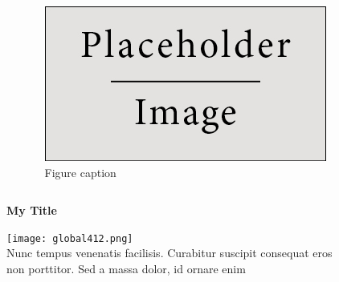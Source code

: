 \documentclass[final]{beamer}
\newlength{\onecolwid}
\newlength{\twocolwid}
\begin{document}
\begin{frame}[t]
\begin{columns}[t]
\begin{column}{\twocolwid}
\begin{columns}[t,totalwidth=\twocolwid]
\begin{column}{\onecolwid}
\end{column} %

\begin{column}{\onecolwid}\vspace{-.6in} %


\begin{figure}
\includegraphics[width=1.0\linewidth]{placeholder.jpg}
\\{Figure caption}
\end{figure}


\end{column} %

\end{columns} %

\begin{figure}
\centering
\textbf{My Title}\par\medskip
\texttt{[image: global412.png]}
\\{Nunc tempus venenatis facilisis. Curabitur suscipit consequat eros non porttitor. Sed a massa dolor, id ornare enim}
\end{figure}
\begin{columns}[t,totalwidth=\twocolwid] %



\begin{column}{\onecolwid} %





\end{column}
\end{columns}
\end{column}
\end{columns}
\end{frame}
\end{document}
